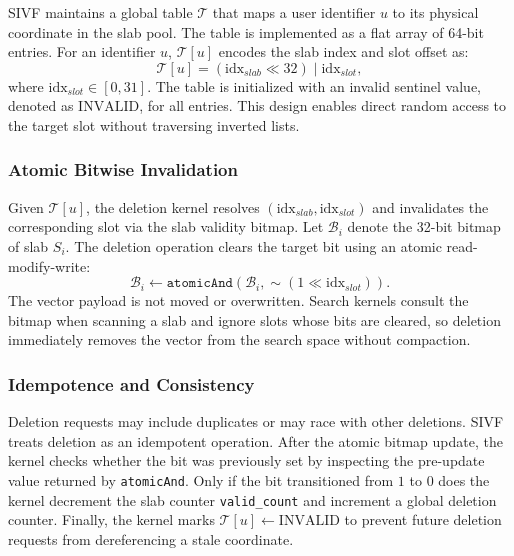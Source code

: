 \documentclass[sigconf,nonacm]{acmart}
\theoremstyle{plain}
\theoremstyle{definition}
\theoremstyle{remark}
\begin{document}
SIVF maintains a global table $\mathcal{T}$ that maps a user identifier $u$ to its physical coordinate in the slab pool. The table is implemented as a flat array of 64-bit entries. For an identifier $u$, $\mathcal{T}[u]$ encodes the slab index and slot offset as:
\begin{equation}
\label{eq:att_encoding}
\mathcal{T}[u] = (\text{idx}_{slab} \ll 32) \mid \text{idx}_{slot},
\end{equation}
where $\text{idx}_{slot} \in [0, 31]$. The table is initialized with an invalid sentinel value, denoted as $\text{INVALID}$, for all entries. This design enables direct random access to the target slot without traversing inverted lists.

\subsubsection{Atomic Bitwise Invalidation}

Given $\mathcal{T}[u]$, the deletion kernel resolves $(\text{idx}_{slab}, \text{idx}_{slot})$ and invalidates the corresponding slot via the slab validity bitmap. Let $\mathcal{B}_{i}$ denote the 32-bit bitmap of slab $S_i$. The deletion operation clears the target bit using an atomic read-modify-write:
\begin{equation}
\label{eq:bitmap_clear}
\mathcal{B}_{i} \leftarrow \texttt{atomicAnd}(\mathcal{B}_{i}, \sim(1 \ll \text{idx}_{slot})).
\end{equation}
The vector payload is not moved or overwritten. Search kernels consult the bitmap when scanning a slab and ignore slots whose bits are cleared, so deletion immediately removes the vector from the search space without compaction.

\subsubsection{Idempotence and Consistency}

Deletion requests may include duplicates or may race with other deletions. SIVF treats deletion as an idempotent operation. After the atomic bitmap update, the kernel checks whether the bit was previously set by inspecting the pre-update value returned by \texttt{atomicAnd}. Only if the bit transitioned from $1$ to $0$ does the kernel decrement the slab counter \texttt{valid\_count} and increment a global deletion counter. Finally, the kernel marks $\mathcal{T}[u] \leftarrow \text{INVALID}$ to prevent future deletion requests from dereferencing a stale coordinate.
\end{document}
